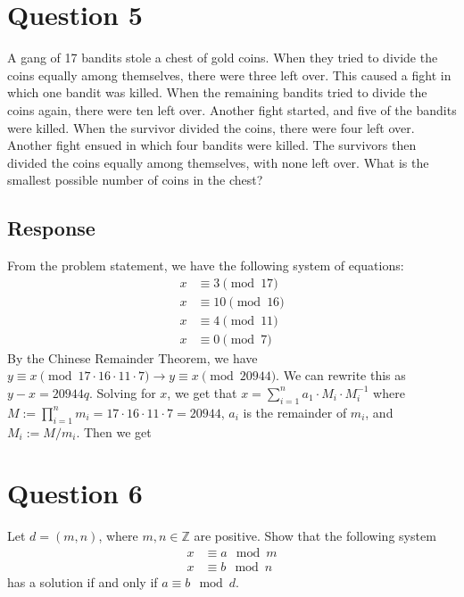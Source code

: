 \documentclass [12pt] {article}
\newcommand{\Z}{\mathbb{Z}}
\begin{document}
\section*{Question 5}
A gang of 17 bandits stole a chest of gold coins.
When they tried to divide the coins equally among themselves, there were three left over. This caused a fight in which one bandit was killed. When the remaining bandits tried to divide the coins again, there were ten left over.
Another fight started, and five of the bandits were killed. When the survivor divided the coins, there were four left over. Another fight ensued in which four bandits were killed. The survivors then divided the coins equally among themselves, with none left over. What is the smallest possible number of coins in the chest? 

\subsection*{Response}
From the problem statement, we have the following system of equations:
\begin{align*}
    x &\equiv 3 \pmod{17} \\
    x &\equiv 10 \pmod{16} \\
    x &\equiv 4 \pmod{11} \\
    x &\equiv 0 \pmod{7}
\end{align*}
By the Chinese Remainder Theorem, we have $y \equiv x \pmod{17 \cdot 16 \cdot 11 \cdot 7} \to
y \equiv x \pmod{20944}$. We can rewrite this as $y - x = 20944q$. Solving for $x$, we get that
$x = \sum^{n}_{i = 1} a_1 \cdot M_i \cdot M_i^{-1}$ where 
$M := \prod^{n}_{i = 1} m_i = 17 \cdot 16 \cdot 11 \cdot 7 = 20944$, $a_i$ is the remainder of $m_i$, 
and $M_i := M / m_i$. Then we get 
\newpage

\section*{Question 6}
Let $d=(m,n)$, where $m,n\in\Z$ are positive. Show that the following system 
\begin{align*}
    x& \equiv a\mod m \\
    x& \equiv b\mod n
\end{align*}
has a solution if and only if $a\equiv b\mod d$.
\end{document}
